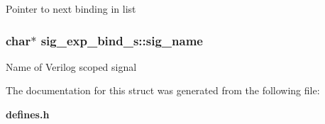 Pointer to next binding in list 
\subsubsection{\setlength{\rightskip}{0pt plus 5cm}char$\ast$ sig\_\-exp\_\-bind\_\-s::sig\_\-name}\label{structsig__exp__bind__s_m0}


Name of Verilog scoped signal 

The documentation for this struct was generated from the following file:\begin{CompactItemize}
\item 
{\bf defines.h}\end{CompactItemize}
